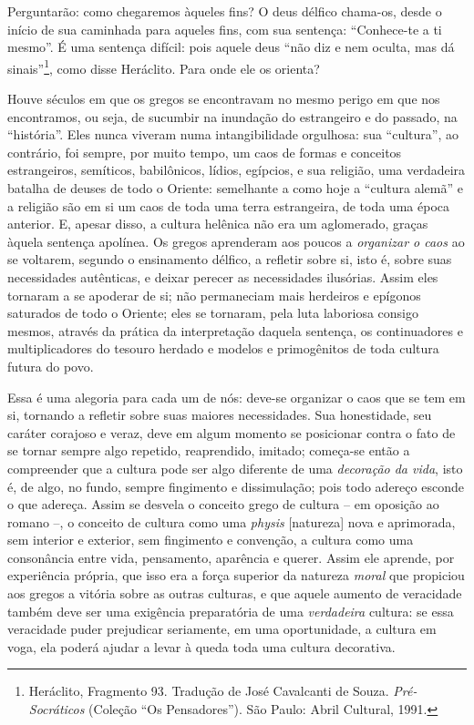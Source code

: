     Perguntarão: como chegaremos àqueles fins? O deus délfico chama-os,
    desde o início de sua caminhada para aqueles fins, com sua sentença:
    ``Conhece-te a ti mesmo''. É uma sentença difícil: pois aquele deus
    ``não diz e nem oculta, mas dá sinais''\footnote{Heráclito,
      Fragmento 93. Tradução de José Cavalcanti de Souza.
      \emph{Pré-Socráticos} (Coleção ``Os Pensadores''). São Paulo:
      Abril Cultural, 1991.}, como disse Heráclito. Para onde ele os
    orienta?

    Houve séculos em que os gregos se encontravam no mesmo perigo em que
    nos encontramos, ou seja, de sucumbir na inundação do estrangeiro e
    do passado, na ``história''. Eles nunca viveram numa intangibilidade
    orgulhosa: sua ``cultura'', ao contrário, foi sempre, por muito
    tempo, um caos de formas e conceitos estrangeiros, semíticos,
    babilônicos, lídios, egípcios, e sua religião, uma verdadeira
    batalha de deuses de todo o Oriente: semelhante a como hoje a
    ``cultura alemã'' e a religião são em si um caos de toda uma terra
    estrangeira, de toda uma época anterior. E, apesar disso, a cultura
    helênica não era um aglomerado, graças àquela sentença apolínea. Os
    gregos aprenderam aos poucos a \emph{organizar o caos} ao se
    voltarem, segundo o ensinamento délfico, a refletir sobre si, isto
    é, sobre suas necessidades autênticas, e deixar perecer as
    necessidades ilusórias.\label{necessidadesilusorias} Assim eles tornaram a se apoderar de si; não
    permaneciam mais herdeiros e epígonos saturados de todo o Oriente;
    eles se tornaram, pela luta laboriosa consigo mesmos, através da
    prática da interpretação daquela sentença, os continuadores e
    multiplicadores do tesouro herdado e modelos e primogênitos de toda
    cultura futura do povo.

    Essa é uma alegoria para cada um de nós: deve-se organizar o caos
    que se tem em si, tornando a refletir sobre suas maiores
    necessidades. Sua honestidade, seu caráter corajoso e veraz, deve em
    algum momento se posicionar contra o fato de se tornar sempre algo
    repetido, reaprendido, imitado; começa-se então a compreender que a
    cultura pode ser algo diferente de uma \emph{decoração da vida},
    isto é, de algo, no fundo, sempre fingimento e dissimulação; pois
    todo adereço esconde o que adereça. Assim se desvela o conceito
    grego de cultura -- em oposição ao romano --, o conceito de cultura
    como uma \emph{physis} {[}natureza{]} nova e aprimorada, sem
    interior e exterior, sem fingimento e convenção, a cultura como uma
    consonância entre vida, pensamento, aparência e querer. Assim ele
    aprende, por experiência própria, que isso era a força superior da
    natureza \emph{moral} que propiciou aos gregos a vitória sobre as
    outras culturas, e que aquele aumento de veracidade também deve ser
    uma exigência preparatória de uma \emph{verdadeira} cultura: se essa
    veracidade puder prejudicar seriamente, em uma oportunidade, a
    cultura em voga, ela poderá ajudar a levar à queda toda uma cultura
    decorativa.